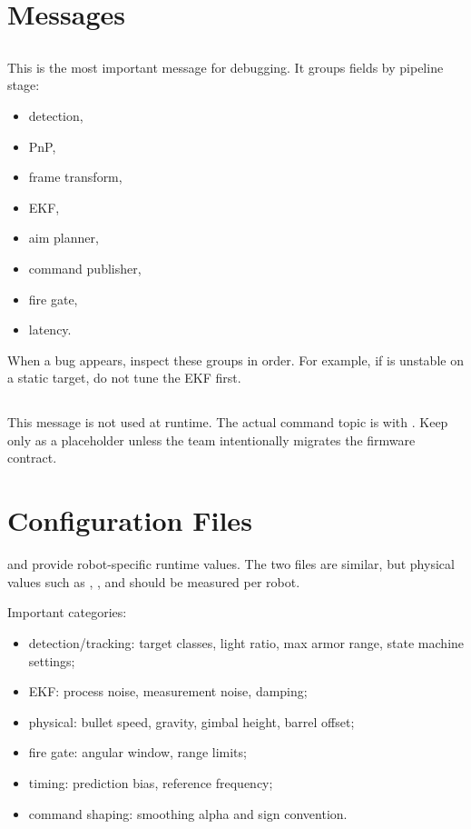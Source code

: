 \section{Messages}

\subsection{}

This is the most important message for debugging. It groups fields by pipeline
stage:

\begin{itemize}
  \item detection,
  \item PnP,
  \item frame transform,
  \item EKF,
  \item aim planner,
  \item command publisher,
  \item fire gate,
  \item latency.
\end{itemize}

When a bug appears, inspect these groups in order. For example, if
 is unstable on a static target, do not tune the EKF first.

\subsection{}

This message is not used at runtime. The actual command topic is
 with . Keep
 only as a placeholder unless the team intentionally
migrates the firmware contract.

\section{Configuration Files}

 and  provide
robot-specific runtime values. The two files are similar, but physical values
such as , , and
 should be measured per robot.

Important categories:

\begin{itemize}
  \item detection/tracking: target classes, light ratio, max armor range,
  state machine settings;
  \item EKF: process noise, measurement noise, damping;
  \item physical: bullet speed, gravity, gimbal height, barrel offset;
  \item fire gate: angular window, range limits;
  \item timing: prediction bias, reference frequency;
  \item command shaping: smoothing alpha and sign convention.
\end{itemize}

